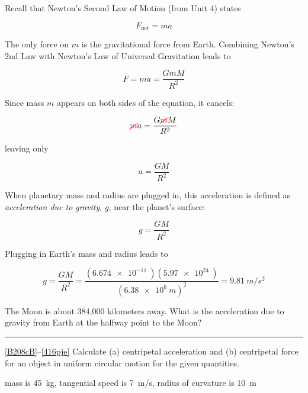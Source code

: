 \documentclass[main-physics.tex]{subfiles}
\begin{document}
Recall that Newton's Second Law of Motion (from Unit 4) states

\begin{equation*}
    F_{\text{net}} = m a
\end{equation*}

The only force on $m$ is the gravitational force from Earth. Combining Newton's 2nd Law with Newton's Law of Universal Gravitation leads to

\begin{equation*}
    F = ma = \frac{G m M}{R^2}
\end{equation*}

Since mass $m$ appears on both sides of the equation, it cancels:

\begin{equation*}
    \textcolor{red}{\cancel{m}}a = \frac{G \textcolor{red}{\cancel{m}} M}{R^2}
\end{equation*}

leaving only

\begin{equation*}
    a = \frac{G M}{R^2}
\end{equation*}

When planetary mass and radius are plugged in, this acceleration is defined as \textit{acceleration due to gravity}, $g$, near the planet's surface:

\begin{equation}
    g = \frac{GM}{R^2}
\end{equation}


Plugging in Earth's mass and radius leads to 

\begin{equation*} 
    g = \frac{GM}{R^2} = \frac{\left(\SI{6.674e-11}{}\right)\left(\SI{5.97e24}{}\right)}{\left(\SI{6.38e6}{m}\right)^2} = \SI{9.81}{m/s^2}
\end{equation*}


\begin{exercise} \label{knMwSV}
The Moon is about 384,000 kilometers away. What is the acceleration due to gravity from Earth at the halfway point to the Moon? 
\end{exercise}

\hrule

\ref{B208cB}--\ref{416pje} Calculate (a) centripetal acceleration and (b) centripetal force for an object in uniform circular motion for the given quantities.

\begin{exercise} \label{B208cB}
mass is \SI{45}{kg}, tangential speed is \SI{7}{m/s}, radius of curvature is \SI{10}{m}
\end{exercise}
\end{document}
